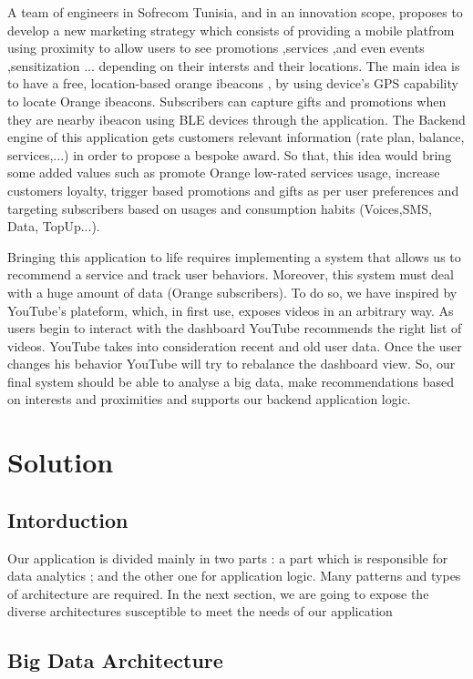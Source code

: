  A team of engineers in Sofrecom Tunisia, and in an innovation scope, proposes to develop a new marketing strategy which consists of 
 providing a mobile platfrom using proximity to allow users to see promotions ,services ,and even events
  ,sensitization ... depending on their intersts and their locations. The main idea is to have a free, location-based
   orange ibeacons , by using device’s GPS capability to locate Orange ibeacons. Subscribers can capture gifts and promotions when they are nearby ibeacon using BLE devices through the application. The Backend engine of this application gets customers relevant information (rate plan, balance, services,...) in order to propose a bespoke award. So that, this idea would bring some added values such as promote Orange low-rated services usage, increase customers loyalty, trigger based promotions and gifts as per user preferences and targeting subscribers based on usages and consumption habits (Voices,SMS, Data, TopUp...).

Bringing this application to life requires implementing a system that allows us to recommend a service and track user behaviors. Moreover, this system must deal with a huge amount of data (Orange subscribers). To do so, we have inspired by YouTube’s plateform, which, in ﬁrst use, exposes videos in an arbitrary way. As users begin to interact with the dashboard YouTube recommends the right list of videos. YouTube takes into consideration recent and old user data. Once the user changes his behavior YouTube will try to rebalance the dashboard view. So, our final system should be able to analyse a big data, make recommendations based on interests and proximities and supports our backend application logic.
\section{Solution}
\label{subsec:subsec01}

\subsection{Intorduction}
\label{subsec:subsec01}
Our application is divided mainly in two parts : a part which is responsible for data analytics ; 
and the other one for application logic. Many patterns and types of architecture are required.
In the next section, we are going to expose the diverse architectures susceptible to meet the needs of our application
\subsection{Big Data Architecture}
\label{subsec:subsec01}

